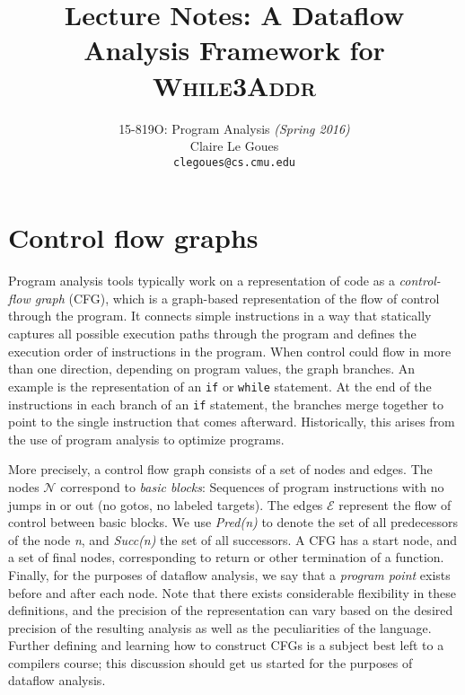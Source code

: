 \documentclass[11pt]{article}
\title{Lecture Notes:
A Dataflow Analysis Framework for \textsc{While3Addr}}
\author{15-819O: Program Analysis \emph{(Spring 2016)}  \\
        Claire Le Goues \\
		{\tt clegoues@cs.cmu.edu}}
\date{}
\begin{document}
\newtheorem{theorem}{Theorem}
\newtheorem{lemma}[theorem]{Lemma}

\maketitle



\section{Control flow graphs}

Program analysis tools typically work on a representation of code as a \textit{control-flow graph} 
(CFG), which is a graph-based representation of the flow of control through the program.
It connects simple instructions in a way that statically captures all possible execution paths through 
the program and defines the execution order of instructions in the program.  When control could flow 
in more than one direction, depending on program values, the graph branches.  An example is the 
representation of an \texttt{if} or \texttt{while} statement.  At the end of the instructions in each branch of an \texttt{if} 
statement, the branches merge together to point to the single instruction that comes afterward.  Historically, 
this arises from the use of program analysis to optimize programs.

More precisely, a control flow graph consists of a set of nodes and edges. The
nodes $\mathcal{N}$ correspond to \textit{basic blocks}: Sequences of program
instructions with no jumps in or out (no gotos, no labeled targets).  The edges
$\mathcal{E}$ represent the flow of control between basic blocks.  We use
\textit{Pred(n)} to denote the set of all predecessors of the node \textit{n},
and \textit{Succ(n)} the set of all successors.  A CFG has a start node, and a
set of final nodes, corresponding to return or other termination of a function.
Finally, for the purposes of dataflow analysis, we say that a \emph{program
  point} exists before and after each node.  Note that there exists considerable
flexibility in these definitions, and the precision of the representation can
vary based on the desired precision of the resulting analysis as well as the
peculiarities of the language.  Further defining and learning how to construct
CFGs is a subject best left to a compilers course; this discussion should get us
started for the purposes of dataflow analysis.
\end{document}
